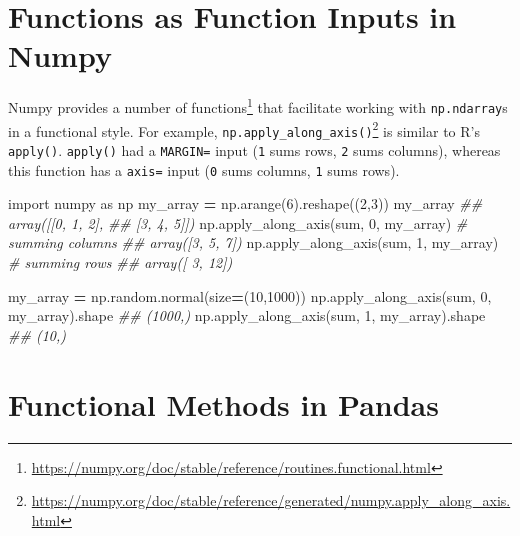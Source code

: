 \documentclass[
  12pt,
]{krantz}
\makeatletter
\newenvironment{Shaded}{\begin{snugshade}}{\end{snugshade}}
\newcommand{\BuiltInTok}[1]{#1}
\newcommand{\CommentTok}[1]{\textcolor[rgb]{0.37,0.37,0.37}{\textit{#1}}}
\newcommand{\DecValTok}[1]{\textcolor[rgb]{0.06,0.06,0.06}{#1}}
\newcommand{\ImportTok}[1]{#1}
\newcommand{\NormalTok}[1]{#1}
\newcommand{\OperatorTok}[1]{\textcolor[rgb]{0.43,0.43,0.43}{\textbf{#1}}}
\renewcommand{\href}[2]{#2\footnote{\url{#1}}}
\newenvironment{kframe}{%
\medskip{}
\setlength{\fboxsep}{.8em}
 \def\at@end@of@kframe{}%
 \ifinner\ifhmode%
  \def\at@end@of@kframe{\end{minipage}}%
  \begin{minipage}{\columnwidth}%
 \fi\fi%
 \def\FrameCommand##1{\hskip\@totalleftmargin \hskip-\fboxsep
 \colorbox{shadecolor}{##1}\hskip-\fboxsep
     \hskip-\linewidth \hskip-\@totalleftmargin \hskip\columnwidth}%
 \MakeFramed {\advance\hsize-\width
   \@totalleftmargin\z@ \linewidth\hsize
   \@setminipage}}%
 {\par\unskip\endMakeFramed%
 \at@end@of@kframe}
\renewenvironment{Shaded}{\begin{kframe}}{\end{kframe}}
\makeatother
\begin{document}
\hypertarget{functions-as-function-inputs-in-numpy}{%
\section{Functions as Function Inputs in Numpy}\label{functions-as-function-inputs-in-numpy}}

Numpy provides a \href{https://numpy.org/doc/stable/reference/routines.functional.html}{number of functions} that facilitate working with \texttt{np.ndarray}s in a functional style. For example, \href{https://numpy.org/doc/stable/reference/generated/numpy.apply_along_axis.html}{\texttt{np.apply\_along\_axis()}} is similar to R's \texttt{apply()}. \texttt{apply()} had a \texttt{MARGIN=} input (\texttt{1} sums rows, \texttt{2} sums columns), whereas this function has a \texttt{axis=} input (\texttt{0} sums columns, \texttt{1} sums rows).

\begin{Shaded}
\begin{Highlighting}[]
\ImportTok{import}\NormalTok{ numpy }\ImportTok{as}\NormalTok{ np}
\NormalTok{my\_array }\OperatorTok{=}\NormalTok{ np.arange(}\DecValTok{6}\NormalTok{).reshape((}\DecValTok{2}\NormalTok{,}\DecValTok{3}\NormalTok{))}
\NormalTok{my\_array}
\CommentTok{\#\# array([[0, 1, 2],}
\CommentTok{\#\#        [3, 4, 5]])}
\NormalTok{np.apply\_along\_axis(}\BuiltInTok{sum}\NormalTok{, }\DecValTok{0}\NormalTok{, my\_array) }\CommentTok{\# summing columns}
\CommentTok{\#\# array([3, 5, 7])}
\NormalTok{np.apply\_along\_axis(}\BuiltInTok{sum}\NormalTok{, }\DecValTok{1}\NormalTok{, my\_array) }\CommentTok{\# summing rows}
\CommentTok{\#\# array([ 3, 12])}
\end{Highlighting}
\end{Shaded}

\begin{Shaded}
\begin{Highlighting}[]
\NormalTok{my\_array }\OperatorTok{=}\NormalTok{ np.random.normal(size}\OperatorTok{=}\NormalTok{(}\DecValTok{10}\NormalTok{,}\DecValTok{1000}\NormalTok{))}
\NormalTok{np.apply\_along\_axis(}\BuiltInTok{sum}\NormalTok{, }\DecValTok{0}\NormalTok{, my\_array).shape }
\CommentTok{\#\# (1000,)}
\NormalTok{np.apply\_along\_axis(}\BuiltInTok{sum}\NormalTok{, }\DecValTok{1}\NormalTok{, my\_array).shape}
\CommentTok{\#\# (10,)}
\end{Highlighting}
\end{Shaded}

\hypertarget{functional-methods-in-pandas}{%
\section{Functional Methods in Pandas}\label{functional-methods-in-pandas}}
\end{document}
